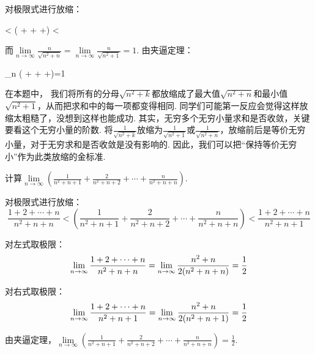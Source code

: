 \begin{solution}
对极限式进行放缩：
\begin{eq1}
     < \left( \displaystyle{} + \displaystyle{} + \cdots +\displaystyle{}\right) < 
\end{eq1}

而$\lim\limits_{n \to \infty}\displaystyle\frac{n}{\sqrt{n^2+n}} = \lim\limits_{n \to \infty}\displaystyle\frac{n}{\sqrt{n^2+1}}=1$.
由夹逼定理：
\begin{eq1}
    \lim\limits_{n \to \infty}\left( \displaystyle{} + \displaystyle{} + \cdots +\displaystyle{}\right)=1
\end{eq1}
\end{solution}

在本题中，
我们将所有的分母$\sqrt{n^{2}+k}$都放缩成了最大值$\sqrt{n^{2}+n}$和最小值$\sqrt{n^{2}+1}$，从而把求和中的每一项都变得相同. 同学们可能第一反应会觉得这样放缩太粗糙了，没想到这样也能成功. 其实，无穷多个无穷小量求和是否收敛，关键要看这个无穷小量的阶数. 将$\displaystyle\frac{1}{\sqrt{n^{2}+k}}$放缩为$\displaystyle\frac{1}{\sqrt{n^{2}+1}}$或$\displaystyle\frac{1}{\sqrt{n^{2}+n}}$，放缩前后是等价无穷小量，对于无穷求和是否收敛是没有影响的. 因此，我们可以把“保持等价无穷小”作为此类放缩的金标准.

\begin{example}
\label{ex:ch01-19}
计算$\lim\limits_{n \to \infty}\left(  \displaystyle\frac{1}{n^2+n+1}+ \displaystyle\frac{2}{n^2+n+2}+ \cdots +\displaystyle\frac{n}{n^2+n+n}\right)$.
\end{example}

\begin{solution}
对极限式进行放缩：
$$
\displaystyle\frac{1+2+\cdots + n}{n^{2}+n+n} <
\left(  \displaystyle\frac{1}{n^2+n+1}+ \displaystyle\frac{2}{n^2+n+2}+ \cdots +\displaystyle\frac{n}{n^2+n+n}\right)
< \displaystyle\frac{1+2+\cdots + n}{n^{2}+n+1}
$$

对左式取极限：
$$
\lim\limits_{n \to \infty}\displaystyle\frac{1+2+\cdots + n}{n^{2}+n+n} =
\lim\limits_{n \to \infty} \displaystyle\frac{n^{2}+n}{2(n^{2}+n+n)} = \frac{1}{2}
$$

对右式取极限：
$$
\lim\limits_{n \to \infty}\displaystyle\frac{1+2+\cdots + n}{n^{2}+n+1} =
\lim\limits_{n \to \infty} \displaystyle\frac{n^{2}+n}{2(n^{2}+n+1)} = \frac{1}{2}
$$

由夹逼定理，$\lim\limits_{n \to \infty}\left(  \displaystyle\frac{1}{n^2+n+1}+ \displaystyle\frac{2}{n^2+n+2}+ \cdots +\displaystyle\frac{n}{n^2+n+n}\right)=\displaystyle\frac{1}{2}$.
\end{solution}

